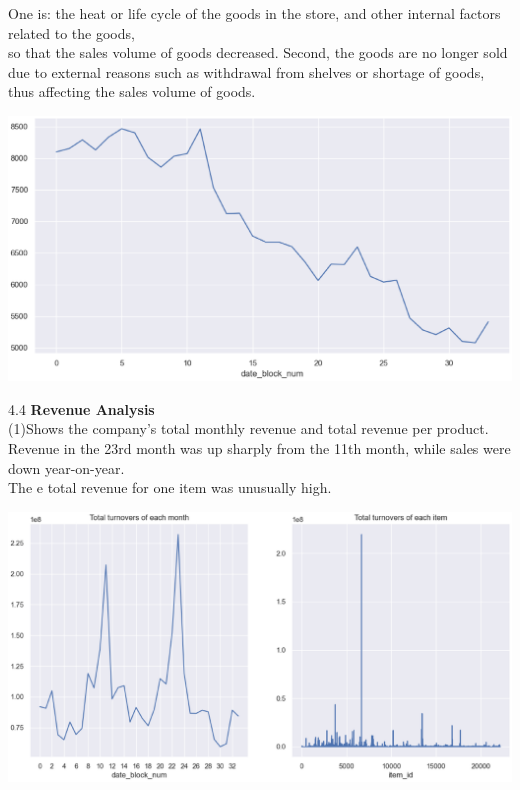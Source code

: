 One is: the heat or life cycle of the goods in the store, and other internal factors related to the goods,\\
so that the sales volume of goods decreased.
Second, the goods are no longer sold due to external reasons such as withdrawal from shelves or shortage of goods,\\
thus affecting the sales volume of goods.
\begin{center}

  \begin{minipage}{0.5\linewidth}
  \centering

  \includegraphics[width=1.1\textwidth]{logos/sloditem.eps}
  

  \end{minipage}
\end{center}
4.4 \textbf{Revenue Analysis}\\
(1)Shows the company's total monthly revenue and total revenue per product.\\
Revenue in the 23rd month was up sharply from the 11th month, while sales were down year-on-year.\\
The e total revenue for one item was unusually high.\\
\begin{center}

  \begin{minipage}{0.5\linewidth}
  \centering

  \includegraphics[width=1.1\textwidth]{logos/turnover.eps}
  

  \end{minipage}

\end{center}
